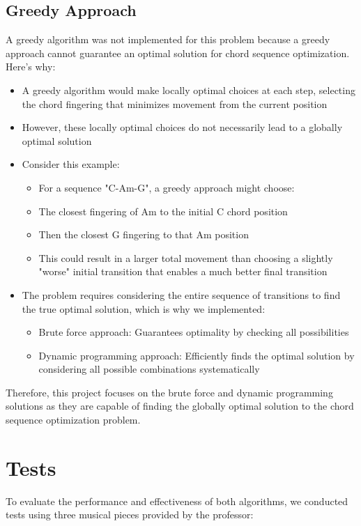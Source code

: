 \documentclass[conference]{IEEEtran}
\begin{document}
\subsection{Greedy Approach}
A greedy algorithm was not implemented for this problem because a greedy approach cannot guarantee an optimal solution for chord sequence optimization. Here's why:

\begin{itemize}
    \item A greedy algorithm would make locally optimal choices at each step, selecting the chord fingering that minimizes movement from the current position
    \item However, these locally optimal choices do not necessarily lead to a globally optimal solution
    \item Consider this example:
    \begin{itemize}
        \item For a sequence "C-Am-G", a greedy approach might choose:
        \item The closest fingering of Am to the initial C chord position
        \item Then the closest G fingering to that Am position
        \item This could result in a larger total movement than choosing a slightly "worse" initial transition that enables a much better final transition
    \end{itemize}
    \item The problem requires considering the entire sequence of transitions to find the true optimal solution, which is why we implemented:
    \begin{itemize}
        \item Brute force approach: Guarantees optimality by checking all possibilities
        \item Dynamic programming approach: Efficiently finds the optimal solution by considering all possible combinations systematically
    \end{itemize}
\end{itemize}

Therefore, this project focuses on the brute force and dynamic programming solutions as they are capable of finding the globally optimal solution to the chord sequence optimization problem.

\section{Tests}
To evaluate the performance and effectiveness of both algorithms, we conducted tests using three musical pieces provided by the professor:
\end{document}
